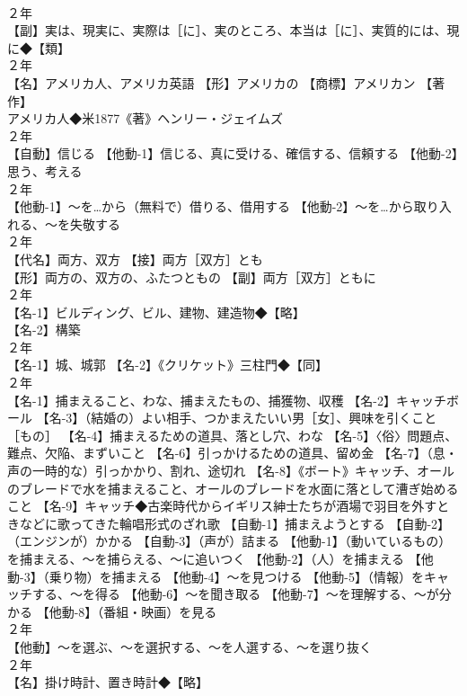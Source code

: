 \documentclass[8pt]{extreport}
\begin{document}
\begin{CJK}{UTF8}{min}
\\	２年	
\\	【副】実は、現実に、実際は［に］、実のところ、本当は［に］、実質的には、現に◆【類】
\\	２年	
\\	【名】アメリカ人、アメリカ英語 【形】アメリカの 【商標】アメリカン 【著作】
\\	アメリカ人◆米1877《著》ヘンリー・ジェイムズ
\\	２年	
\\	【自動】信じる 【他動-1】信じる、真に受ける、確信する、信頼する 【他動-2】思う、考える
\\	２年	
\\	【他動-1】～を…から（無料で）借りる、借用する 【他動-2】～を…から取り入れる、～を失敬する
\\	２年	
\\	【代名】両方、双方 【接】両方［双方］とも
\\	【形】両方の、双方の、ふたつともの 【副】両方［双方］ともに
\\	２年	
\\	【名-1】ビルディング、ビル、建物、建造物◆【略】
\\	【名-2】構築
\\	２年	
\\	【名-1】城、城郭 【名-2】《クリケット》三柱門◆【同】
\\	２年	
\\	【名-1】捕まえること、わな、捕まえたもの、捕獲物、収穫 【名-2】キャッチボール 【名-3】（結婚の）よい相手、つかまえたいい男［女］、興味を引くこと［もの］ 【名-4】捕まえるための道具、落とし穴、わな 【名-5】〈俗〉問題点、難点、欠陥、まずいこと 【名-6】引っかけるための道具、留め金 【名-7】（息・声の一時的な）引っかかり、割れ、途切れ 【名-8】《ボート》キャッチ、オールのブレードで水を捕まえること、オールのブレードを水面に落として漕ぎ始めること 【名-9】キャッチ◆古楽時代からイギリス紳士たちが酒場で羽目を外すときなどに歌ってきた輪唱形式のざれ歌 【自動-1】捕まえようとする 【自動-2】（エンジンが）かかる 【自動-3】（声が）詰まる 【他動-1】（動いているもの）を捕まえる、～を捕らえる、～に追いつく 【他動-2】（人）を捕まえる 【他動-3】（乗り物）を捕まえる 【他動-4】～を見つける 【他動-5】（情報）をキャッチする、～を得る 【他動-6】～を聞き取る 【他動-7】～を理解する、～が分かる 【他動-8】（番組・映画）を見る
\\	２年	
\\	【他動】～を選ぶ、～を選択する、～を人選する、～を選り抜く
\\	２年	
\\	【名】掛け時計、置き時計◆【略】

\end{CJK}
\end{document}
